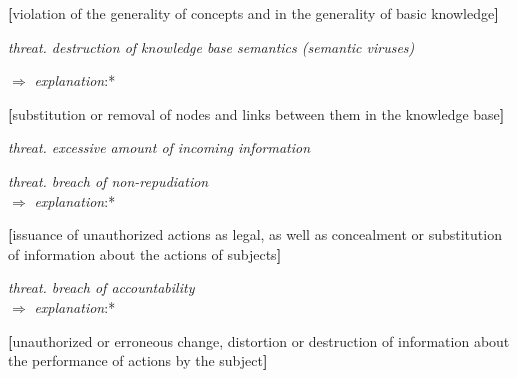 \documentclass{article}
\begin{document}
\begin{multicols}{2}
\begin{description}[leftmargin=!, labelwidth=1cm, itemsep=-1.5mm]

\begin{description}[leftmargin=!, labelwidth=1.2cm, itemsep=-1.5mm]
   \item \textbf{[}violation of the generality of concepts and
in the generality of basic knowledge\textbf{]}
\end{description}
 \vspace{-0.2cm} \item[$\supset$] \textit{threat. destruction of knowledge base semantics
(semantic viruses)}

   \vspace{-0.2cm}  $\Rightarrow$  \hspace{0.5cm} \textit{explanation}:* 
   \par
   \begin{description}[leftmargin=!, labelwidth=0.9cm, itemsep=-1.5mm]
  \item \vspace{-0.3cm}  \textbf{[}substitution or removal of nodes and links
between them in the knowledge base\textbf{]}
\end{description}


   \vspace{-0.2cm} \item[$\supset$] \textit {threat. excessive amount of incoming information} \\
    \vspace{-0.4cm}\item[$\supset$] \textit {threat. breach of non-repudiation} \\
   \vspace{0.1cm} \hspace{-0.23cm}  $\Rightarrow$  \hspace{0.5cm} \textit{explanation}:* 
  \begin{description}[leftmargin=!, labelwidth=0.9cm, itemsep=-1.5mm]
   \item \vspace{-0.4cm}\textbf{[}issuance of unauthorized actions as legal,
as well as concealment or substitution of
information about the actions of subjects\textbf{]}
\end{description}
    
\item[$\supset$] \vspace{-0.2cm} \textit {threat. breach of accountability} \\
\vspace{0.1cm} \hspace{-0.23cm}  $\Rightarrow$  \hspace{0.5cm} \textit{explanation}:* 
 \begin{description}[leftmargin=!, labelwidth=0.9cm, itemsep=-1.5mm]
   \item \vspace{-0.4cm}\textbf{[}unauthorized or erroneous change, distortion or destruction of information about
the performance of actions by the subject\textbf{]}
\end{description}


\end{description}
\end{multicols}
\end{document}
